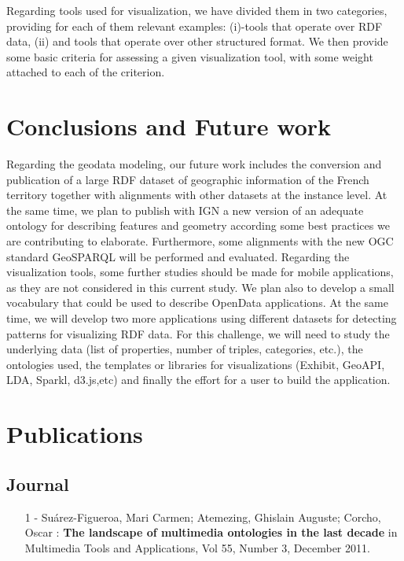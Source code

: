\documentclass[a4paper,11pt]{report}
\begin{document}
Regarding tools used for visualization, we have divided them in two categories, providing for each of them relevant examples: (i)-tools that operate over RDF data, (ii) and tools that operate over other structured format. We then provide some basic criteria for assessing a given visualization tool, with some weight attached to each of the criterion. 




\chapter*{Conclusions and Future work}
Regarding the geodata modeling, our future work includes the conversion and publication of a large RDF dataset of geographic information of the French territory together with alignments with other datasets at the instance level. At the same time, we plan to publish with IGN a new version of an adequate ontology for describing features and geometry according some best practices we are contributing to elaborate. Furthermore, some alignments with the new OGC standard GeoSPARQL will be performed and evaluated.
Regarding the visualization tools, some further studies should be made for mobile applications, as they are not considered in this current study. We plan also to develop a small vocabulary that could be used to describe OpenData applications. At the same time, we will develop two more applications using different datasets for detecting patterns for visualizing RDF data. For this challenge, we will need to study the underlying data (list of properties, number of triples, categories, etc.), the ontologies used, the templates or libraries for visualizations (Exhibit, GeoAPI, LDA, Sparkl, d3.js,etc) and finally the effort for a user to build the application.


{}


{}

\appendix
\chapter{Publications}
\section*{Journal}
\begin{itemize}
\item [1]- Su\'{a}rez-Figueroa, Mari Carmen; Atemezing, Ghislain Auguste; Corcho, Oscar : \textbf{The landscape of 
multimedia ontologies in the last decade} in  Multimedia Tools and Applications, Vol 55, Number 3, December 2011.
\end{itemize}
\end{document}
